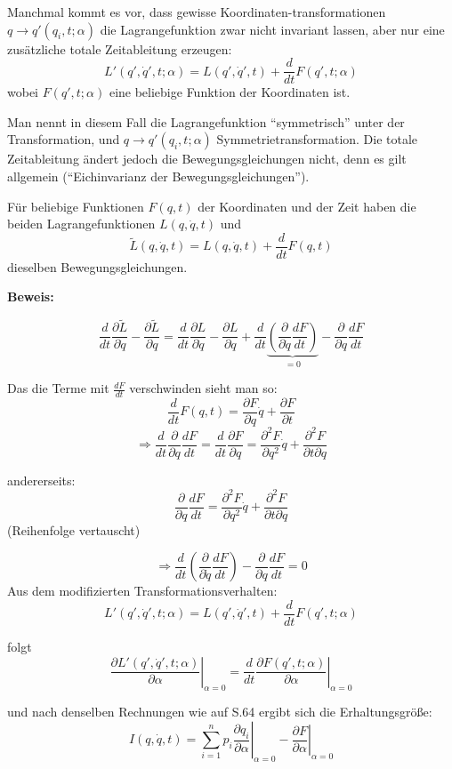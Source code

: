 \documentclass[10pt, letterpaper]{article}
\begin{document}
Manchmal kommt es vor, dass gewisse Koordinaten-transformationen $q \to q'(q_i,t;\alpha)$ die Lagrangefunktion zwar nicht invariant lassen, aber nur eine zusätzliche totale Zeitableitung erzeugen:
\[L'(q',\dot{q}',t;\alpha) = L(q',\dot{q}',t) + \frac{d}{dt}F(q',t;\alpha)\]
wobei $F(q',t;\alpha)$ eine beliebige Funktion der Koordinaten ist.

Man nennt in diesem Fall die Lagrangefunktion ``symmetrisch'' unter der Transformation, und $q \to q'(q_i,t;\alpha)$ Symmetrietransformation. Die totale Zeitableitung ändert jedoch die Bewegungsgleichungen nicht, denn es gilt allgemein (``Eichinvarianz der Bewegungsgleichungen'').

Für beliebige Funktionen $F(q,t)$ der Koordinaten und der Zeit haben die beiden Lagrangefunktionen $L(q,\dot{q},t)$ und 
\[\tilde{L}(q,\dot{q},t) = L(q,\dot{q},t) + \frac{d}{dt}F(q,t)\] dieselben Bewegungsgleichungen.




\textbf{Beweis:}

\[\frac{d}{dt}\frac{\partial \tilde{L}}{\partial \dot{q}} - \frac{\partial \tilde{L}}{\partial q} = \frac{d}{dt}\frac{\partial L}{\partial \dot{q}} - \frac{\partial L}{\partial q} + \frac{d}{dt}\underbrace{\left(\frac{\partial}{\partial \dot{q}}\frac{dF}{dt}\right)}_{=0} - \frac{\partial}{\partial q}\frac{dF}{dt}\]

Das die Terme mit $\frac{dF}{dt}$ verschwinden sieht man so:
\[\frac{d}{dt}F(q,t) = \frac{\partial F}{\partial q}\dot{q} + \frac{\partial F}{\partial t}\]
\[\Rightarrow \frac{d}{dt}\frac{\partial}{\partial q}\frac{dF}{dt} = \frac{d}{dt}\frac{\partial F}{\partial q} = \frac{\partial^2 F}{\partial q^2}\dot{q} + \frac{\partial^2 F}{\partial t\partial q}\]

andererseits: \[\frac{\partial}{\partial q}\frac{dF}{dt} = \frac{\partial^2 F}{\partial q^2}\dot{q} + \frac{\partial^2 F}{\partial t\partial q}\]
(Reihenfolge vertauscht)

\[\Rightarrow \frac{d}{dt}\left(\frac{\partial}{\partial \dot{q}}\frac{dF}{dt}\right) - \frac{\partial}{\partial q}\frac{dF}{dt} = 0\]
Aus dem modifizierten Transformationsverhalten:
\[L'(q',\dot{q}',t;\alpha) = L(q',\dot{q}',t) + \frac{d}{dt}F(q',t;\alpha)\]

folgt
\[\left.\frac{\partial L'(q',\dot{q}',t;\alpha)}{\partial \alpha}\right|_{\alpha=0} = \frac{d}{dt}\left.\frac{\partial F(q',t;\alpha)}{\partial \alpha}\right|_{\alpha=0}\]

und nach denselben Rechnungen wie auf S.64 ergibt sich die Erhaltungsgröße:
\[I(q,\dot{q},t) = \sum_{i=1}^n p_i\left.\frac{\partial q_i}{\partial \alpha}\right|_{\alpha=0} - \left.\frac{\partial F}{\partial \alpha}\right|_{\alpha=0}\]
\end{document}
